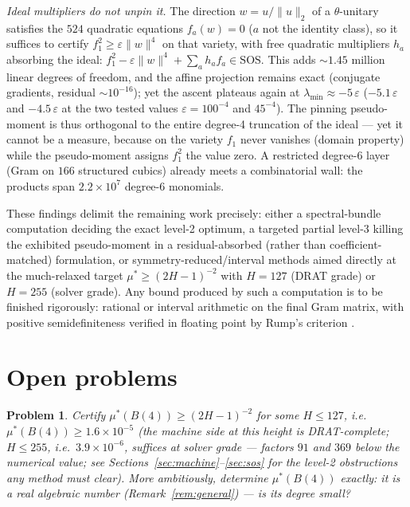 \documentclass[10pt,a4paper]{amsart}
\newtheorem{problem}[theorem]{Problem}
\begin{document}
\emph{Ideal multipliers do not unpin it.}  The direction $w=u/\|u\|_2$
of a $\theta$-unitary satisfies the $524$ quadratic equations
$f_a(w)=0$ ($a$ not the identity class), so it suffices to certify
$f_1^2\ge\varepsilon\|w\|^4$ on that variety, with free quadratic
multipliers $h_a$ absorbing the ideal:
$f_1^2-\varepsilon\|w\|^4+\sum_a h_af_a\in\mathrm{SOS}$.  This adds
$\sim1.45$ million linear degrees of freedom, and the affine
projection remains exact (conjugate gradients, residual
$\sim10^{-16}$); yet the ascent plateaus again at
$\lambda_{\min}\approx-5\,\varepsilon$ ($-5.1\,\varepsilon$ and
$-4.5\,\varepsilon$ at the two tested values
$\varepsilon=100^{-4}$ and $45^{-4}$).  The pinning pseudo-moment is thus
orthogonal to the entire degree-4 truncation of the ideal --- yet it
cannot be a measure, because on the variety $f_1$ never vanishes
(domain property) while the pseudo-moment assigns $f_1^2$ the value
zero.  A restricted degree-6 layer (Gram on $166$ structured cubics)
already meets a combinatorial wall: the products span $2.2\times10^7$
degree-6 monomials.

These findings delimit the remaining work precisely: either a
spectral-bundle computation deciding the exact level-2 optimum, a
targeted partial level-3 killing the exhibited pseudo-moment in a
residual-absorbed (rather than coefficient-matched) formulation, or
symmetry-reduced/interval methods aimed directly at the much-relaxed
target $\mu^*\ge(2H-1)^{-2}$ with $H=127$ (DRAT grade) or $H=255$
(solver grade).  Any bound produced by such a computation is to be
finished rigorously: rational or interval arithmetic on the final Gram
matrix, with positive semidefiniteness verified in floating point by
Rump's criterion \cite{Rump2006}.

\section{Open problems}\label{sec:problems}

\begin{problem}\label{prob:cert}
Certify $\mu^*(B(4))\ge(2H-1)^{-2}$ for some $H\le 127$, i.e.\
$\mu^*(B(4))\ge 1.6\times10^{-5}$ (the machine side at this height is
DRAT-complete; $H\le 255$, i.e.\ $3.9\times10^{-6}$, suffices at
solver grade --- factors $91$ and $369$ below the numerical value; see
Sections~\ref{sec:machine}--\ref{sec:sos} for the level-2 obstructions
any method must clear).  More ambitiously, determine $\mu^*(B(4))$
exactly: it is a real algebraic number (Remark~\ref{rem:general}) ---
is its degree small?
\end{problem}
\end{document}
